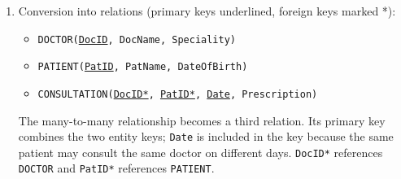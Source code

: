 \documentclass[11pt]{article}
\begin{document}
\begin{corrige}
\begin{enumerate}
\item Conversion into relations (primary keys underlined, foreign keys marked *):
\begin{itemize}
\item \texttt{DOCTOR(\underline{DocID}, DocName, Speciality)}
\item \texttt{PATIENT(\underline{PatID}, PatName, DateOfBirth)}
\item \texttt{CONSULTATION(\underline{DocID*}, \underline{PatID*}, \underline{Date}, Prescription)}
\end{itemize}
The many-to-many relationship becomes a third relation. Its primary key combines the two entity keys; \texttt{Date} is included in the key because the same patient may consult the same doctor on different days. \texttt{DocID*} references \texttt{DOCTOR} and \texttt{PatID*} references \texttt{PATIENT}.
\end{enumerate}
\end{corrige}
\end{document}

